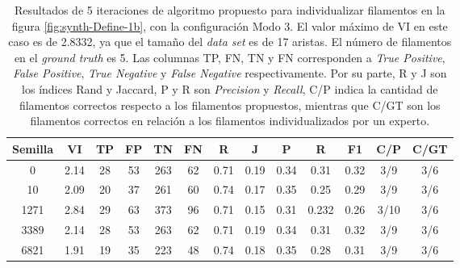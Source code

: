 \begin{table}[h]
    \centering
    \begin{tabular}{|c|c|c|c|c|c|c|c|c|c|c|c|c|}
    \hline
        Semilla & VI & TP & FP &TN &FN & R	& J & P & R &F1 & C/P & C/GT \\ \hline 
        0  & 2.14 & 28 & 53 & 263 & 62 & 0.71 & 0.19 & 0.34 & 0.31 & 0.32 & 3/9 & 3/6\\
        10 & 2.09 & 20 & 37 & 261 & 60 & 0.74 & 0.17 & 0.35 & 0.25 & 0.29 & 3/9 & 3/6\\
        1271 & 2.84 & 29 & 63 & 373 & 96 & 0.71 & 0.15& 0.31 & 0.232 & 0.26 & 3/10 & 3/6\\
        3389 & 2.14 & 28 & 53 & 263 & 62 & 0.71 & 0.19 & 0.34 & 0.31 & 0.32 & 3/9 & 3/6\\
        6821 & 1.91 & 19 & 35 & 223 & 48 & 0.74 & 0.18 & 0.35 & 0.28 & 0.31 & 3/9 & 3/6\\
        \hline
    \end{tabular}
    \caption{Resultados de 5 iteraciones de algoritmo propuesto para individualizar filamentos en la figura \ref{fig:synth-Define-1b}, con la configuraci\'on Modo 3. El valor m\'aximo de VI en este caso es de 2.8332, ya que el tama\~no del {\it data set} es de 17 aristas. El n\'umero de filamentos en el {\it ground truth} es 5. Las columnas TP, FN, TN y FN corresponden a {\it True Positive}, {\it  False Positive}, {\it True Negative} y {\it False Negative} respectivamente. Por su parte, R y J son los \'indices Rand y Jaccard, P y R son {\it Precision} y {\it Recall}, C/P indica la cantidad de filamentos correctos respecto a los filamentos propuestos, mientras que C/GT son los filamentos correctos en relaci\'on a los filamentos individualizados por un experto.}
    \label{tab:Synth-Define-1b-DetailedResults1}
\end{table}



